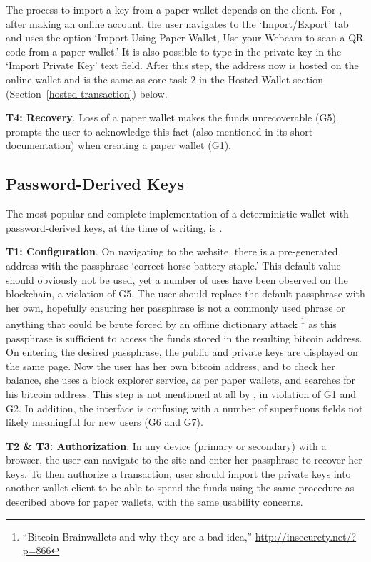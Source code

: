 The process to import a key from a paper wallet depends on the client. For \block, after making an online account, the user navigates to the `Import/Export' tab and uses the option `Import Using Paper Wallet, Use your Webcam to scan a QR code from a paper wallet.' It is also possible to type in the private key in the `Import Private Key' text field. After this step, the address now is hosted on the online wallet and is the same as core task 2 in the Hosted Wallet section (Section~\ref{hosted transaction}) below.

\textbf{T4: Recovery}.
Loss of a paper wallet makes the funds unrecoverable (G5). \paper prompts the user to acknowledge this fact (also mentioned in its short documentation) when creating a paper wallet (G1).

\subsection{Password-Derived Keys} The most popular and complete implementation of a deterministic wallet with password-derived keys, at the time of writing, is \brain.

\textbf{T1: Configuration}.
On navigating to the \brain website, there is a pre-generated address with the passphrase `correct horse battery staple.' This default value should obviously not be used, yet a number of uses have been observed on the blockchain, a violation of G5. The user should replace the default passphrase with her own, hopefully ensuring her passphrase is not a commonly used phrase or anything that could be brute forced by an offline dictionary attack \footnote{``Bitcoin Brainwallets and why they are a bad idea,'' \url{http://insecurety.net/?p=866}} as this passphrase is sufficient to access the funds stored in the resulting bitcoin address. On entering the desired passphrase, the public and private keys are displayed on the same page. Now the user has her own bitcoin address, and to check her balance, she uses  a block explorer service, as per paper wallets, and searches for his bitcoin address. This step is not mentioned at all by \brain, in violation of G1 and G2. In addition, the interface is confusing with a number of superfluous fields not likely meaningful for new users (G6 and G7).

\textbf{T2 \& T3: Authorization}.
In any device (primary or secondary) with a browser, the user can navigate to the \brain site and enter her passphrase to recover her keys. To then authorize a transaction, user should import the private keys into another wallet client to be able to spend the funds using the same procedure as described above for paper wallets, with the same usability concerns.

